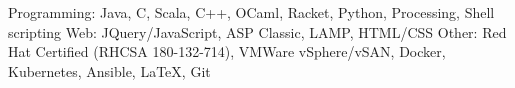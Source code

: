 \begin{cvskills}
    \cvskill
    {Programming:}
    {Java, C, Scala, C++, OCaml, Racket, Python, Processing, Shell scripting}
	\cvskill
	{Web:}
	{JQuery/JavaScript, ASP Classic, LAMP, HTML/CSS}
	\cvskill
	{Other:}
    {Red Hat Certified (RHCSA 180-132-714), VMWare vSphere/vSAN, Docker, Kubernetes, Ansible, LaTeX, Git}
	\vspace{-1.5em} %
\end{cvskills}
